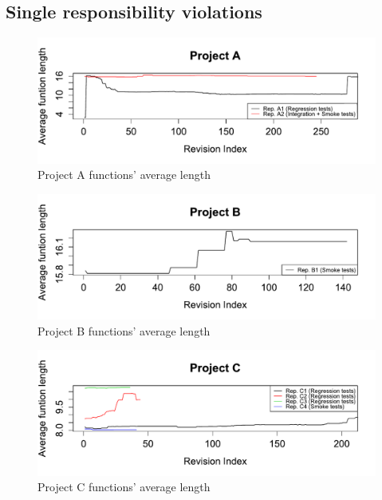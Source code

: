 \FloatBarrier


\subsection{Single responsibility violations}

\begin{figure}[!htbp]
    \centering
    \includegraphics[width=\textwidth]{figure/results/rq1/avg_length_project_a.pdf}
    \caption{Project A functions' average length}
    \label{fig:avg_length_project_a}
\end{figure}

\begin{figure}[!htbp]
    \centering
    \includegraphics[width=\textwidth]{figure/results/rq1/avg_length_project_b.pdf}
    \caption{Project B  functions' average length}
    \label{fig:avg_length_project_b}
\end{figure}

\begin{figure}[!htbp]
    \centering
    \includegraphics[width=\textwidth]{figure/results/rq1/avg_length_project_c.pdf}
    \caption{Project C  functions' average length}
    \label{fig:avg_length_project_c}
\end{figure}

